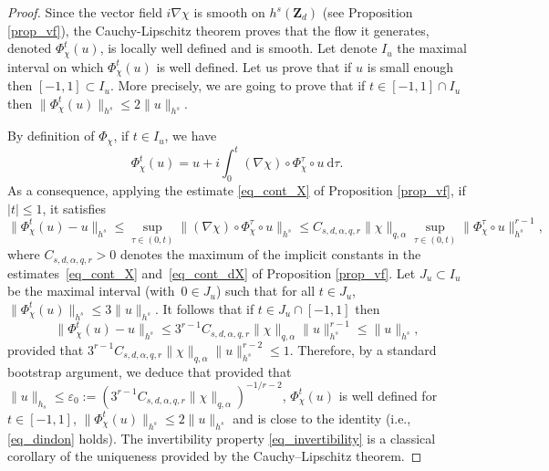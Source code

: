 \documentclass[11pt]{article}
\newcommand{\ie}{i.e.,\xspace}
\theoremstyle{definition}
\begin{document}
\begin{proof} Since the vector field $i \nabla \chi$ is smooth on $h^s(\mathbf{Z}_d)$ (see Proposition \ref{prop_vf}), the Cauchy-Lipschitz theorem proves that the flow it generates, denoted $\Phi_\chi^{t} (u)$, is locally well defined and is smooth. Let denote $I_u$ the maximal interval on which $\Phi_\chi^{t} (u)$ is well defined. Let us prove that if $u$ is small enough then $[-1,1] \subset I_u$. More precisely, we are going to prove that if $t\in [-1,1]\cap I_u$ then $\| \Phi_\chi^{t} (u) \|_{h^s}\leq 2 \| u \|_{h^s}$.

By definition of $\Phi_\chi$, if $t\in I_u$, we have
\[
\Phi_\chi^{t} (u) = u + i \int_0^t (\nabla \chi)\circ \Phi_\chi^\tau \circ u \ \mathrm{d}\tau.
\]
As a consequence, applying the estimate \eqref{eq_cont_X} of Proposition \ref{prop_vf}, if $|t|\leq 1$, it satisfies
\[
\|\Phi_\chi^{t} (u) - u\|_{h^s} \leq \sup_{\tau \in (0,t)} \| (\nabla \chi)\circ \Phi_\chi^\tau \circ u \|_{h^s} \leq C_{s,d,\alpha,q,r} \|\chi \|_{q,\alpha} \sup_{\tau \in (0,t)} \| \Phi_\chi^\tau \circ u\|_{h^s}^{r-1},
\]
where $ C_{s,d,\alpha,q,r} >0$ denotes the maximum of the implicit constants in the estimates~\eqref{eq_cont_X} and~\eqref{eq_cont_dX} of Proposition \ref{prop_vf}. Let $J_u\subset I_u$ be the maximal interval (with~\hbox{$0\in J_u$}) such that for all $t\in J_u$, $\| \Phi_\chi^{t} (u) \|_{h^s}\leq 3 \| u \|_{h^s}$.
It follows that if $t\in J_u \cap [-1,1]$ then
\[
\|\Phi_\chi^{t} (u) - u\|_{h^s} \leq 3^{r-1} C_{s,d,\alpha,q,r} \|\chi \|_{q,\alpha} \| u \|_{h^s}^{r-1} \leq \| u \|_{h^s},
\]
provided that $3^{r-1} C_{s,d,\alpha,q,r} \|\chi \|_{q,\alpha} \| u \|_{h^s}^{r-2}\leq 1$. Therefore, by a standard bootstrap argument, we deduce that provided that $\| u \|_{h_s}\leq \varepsilon_0:= (3^{r-1} C_{s,d,\alpha,q,r} \|\chi \|_{q,\alpha})^{-1/r-2} $, $\Phi_\chi^t(u)$ is well defined for $t\in [-1,1]$, $\| \Phi_\chi^{t} (u) \|_{h^s}\leq 2 \| u \|_{h^s}$ and is close to the identity (\ie \eqref{eq_dindon} holds).
The invertibility property \eqref{eq_invertibility} is a classical corollary of the uniqueness provided by the Cauchy--Lipschitz theorem.


\end{proof}
\end{document}
